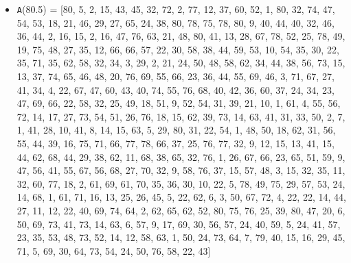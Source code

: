 \documentclass[runningheads, a4paper]{llncs}
\begin{document}
\begin{itemize}
	\item {\texttt A(80.5) = } [80, 5, 2, 15, 43, 45, 32, 72, 2, 77, 12, 37, 60, 52, 1, 80, 32, 74, 47, 54, 53, 18, 21, 46, 29, 27, 65, 24, 38, 80, 78, 75, 78, 80, 9, 40, 44, 40, 32, 46, 36, 44, 2, 16, 15, 2, 16, 47, 76, 63, 21, 48, 80, 41, 13, 28, 67, 78, 52, 25, 78, 49, 19, 75, 48, 27, 35, 12, 66, 66, 57, 22, 30, 58, 38, 44, 59, 53, 10, 54, 35, 30, 22, 35, 71, 35, 62, 58, 32, 34, 3, 29, 2, 21, 24, 50, 48, 58, 62, 34, 44, 38, 56, 73, 15, 13, 37, 74, 65, 46, 48, 20, 76, 69, 55, 66, 23, 36, 44, 55, 69, 46, 3, 71, 67, 27, 41, 34, 4, 22, 67, 47, 60, 43, 40, 74, 55, 76, 68, 40, 42, 36, 60, 37, 24, 34, 23, 47, 69, 66, 22, 58, 32, 25, 49, 18, 51, 9, 52, 54, 31, 39, 21, 10, 1, 61, 4, 55, 56, 72, 14, 17, 27, 73, 54, 51, 26, 76, 18, 15, 62, 39, 73, 14, 63, 41, 31, 33, 50, 2, 7, 1, 41, 28, 10, 41, 8, 14, 15, 63, 5, 29, 80, 31, 22, 54, 1, 48, 50, 18, 62, 31, 56, 55, 44, 39, 16, 75, 71, 66, 77, 78, 66, 37, 25, 76, 77, 32, 9, 12, 15, 13, 41, 15, 44, 62, 68, 44, 29, 38, 62, 11, 68, 38, 65, 32, 76, 1, 26, 67, 66, 23, 65, 51, 59, 9, 47, 56, 41, 55, 67, 56, 68, 27, 70, 32, 9, 58, 76, 37, 15, 57, 48, 3, 15, 32, 35, 11, 32, 60, 77, 18, 2, 61, 69, 61, 70, 35, 36, 30, 10, 22, 5, 78, 49, 75, 29, 57, 53, 24, 14, 68, 1, 61, 71, 16, 13, 25, 26, 45, 5, 22, 62, 6, 3, 50, 67, 72, 4, 22, 22, 14, 44, 27, 11, 12, 22, 40, 69, 74, 64, 2, 62, 65, 62, 52, 80, 75, 76, 25, 39, 80, 47, 20, 6, 50, 69, 73, 41, 73, 14, 63, 6, 57, 9, 17, 69, 30, 56, 57, 24, 40, 59, 5, 24, 41, 57, 23, 35, 53, 48, 73, 52, 14, 12, 58, 63, 1, 50, 24, 73, 64, 7, 79, 40, 15, 16, 29, 45, 71, 5, 69, 30, 64, 73, 54, 24, 50, 76, 58, 22, 43]
	

\end{itemize}
\end{document}
